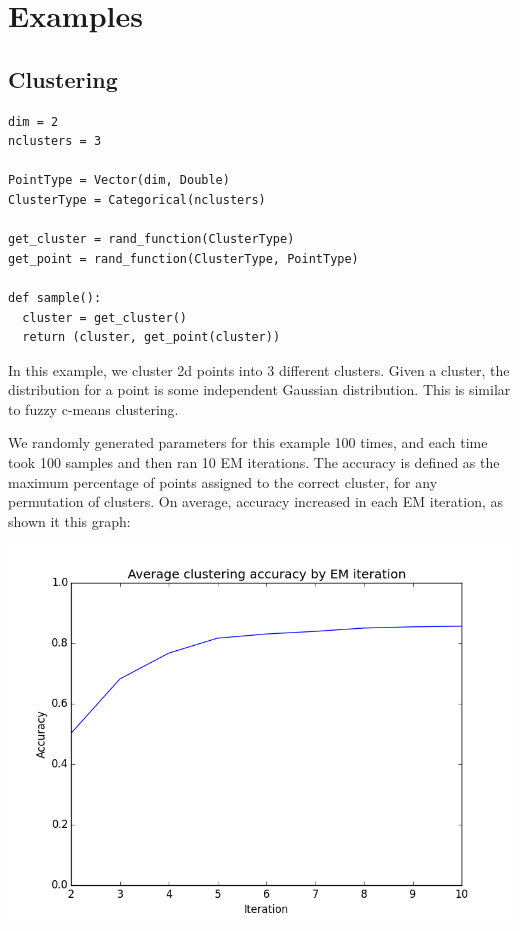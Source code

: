 \documentclass[proceed]{article}
\begin{document}
  \section{Examples}

  \subsection{Clustering}
\begin{verbatim}
dim = 2
nclusters = 3

PointType = Vector(dim, Double)
ClusterType = Categorical(nclusters)

get_cluster = rand_function(ClusterType)
get_point = rand_function(ClusterType, PointType)

def sample():
  cluster = get_cluster()
  return (cluster, get_point(cluster))
\end{verbatim}

In this example, we cluster 2d points into 3 different clusters.  Given a cluster, the distribution for a point is some independent Gaussian distribution.  This is similar to fuzzy c-means clustering.

We randomly generated parameters for this example 100 times, and each time took 100 samples and then ran 10 EM iterations.  The accuracy is defined as the maximum percentage of points assigned to the correct cluster, for any permutation of clusters.  On average, accuracy increased in each EM iteration, as shown it this graph:

\begin{center}
\includegraphics[scale=0.5]{cluster_accuracy.png}
\end{center}
\end{document}
